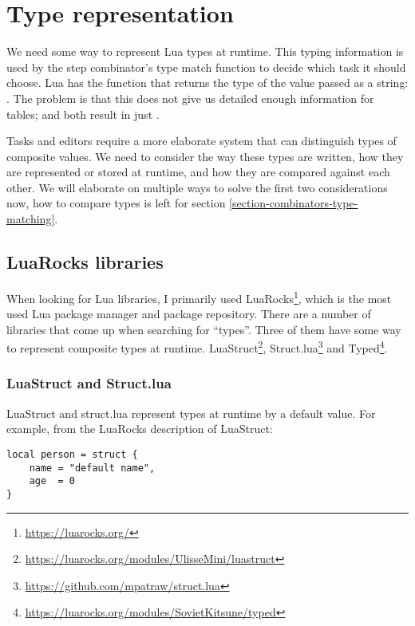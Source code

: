 \section{Type representation}\label{section-task-types}
We need some way to represent Lua types at runtime. This typing information is used by the step combinator's type match function to decide which task it should choose.
Lua has the  function that returns the type of the value passed as a string: . The problem is that this does not give us detailed enough information for tables;  and  both result in just .

Tasks and editors require a more elaborate system that can distinguish types of composite values. We need to consider the way these types are written, how they are represented or stored at runtime, and how they are compared against each other. We will elaborate on multiple ways to solve the first two considerations now, how to compare types is left for section \ref{section-combinators-type-matching}.

\subsection{LuaRocks libraries}\label{section-task-types-luarocks}
When looking for Lua libraries, I primarily used LuaRocks\footnote{\label{footnote-luarocks}\url{https://luarocks.org/}}, which is the most used Lua package manager and package repository. There are a number of libraries that come up when searching for ``types''. Three of them have some way to represent composite types at runtime.
LuaStruct\footnote{\label{footnote-luastruct}\url{https://luarocks.org/modules/UlisseMini/luastruct}},
Struct.lua\footnote{\url{https://github.com/mpatraw/struct.lua}} and
Typed\footnote{\label{footnote-typed}\url{https://luarocks.org/modules/SovietKitsune/typed}}.

\subsubsection{LuaStruct and Struct.lua}
LuaStruct and struct.lua represent types at runtime by a default value. For example, from the LuaRocks description of LuaStruct:

\medskip
\begin{verbatim}
local person = struct {
    name = "default name",
    age  = 0
}
\end{verbatim}

